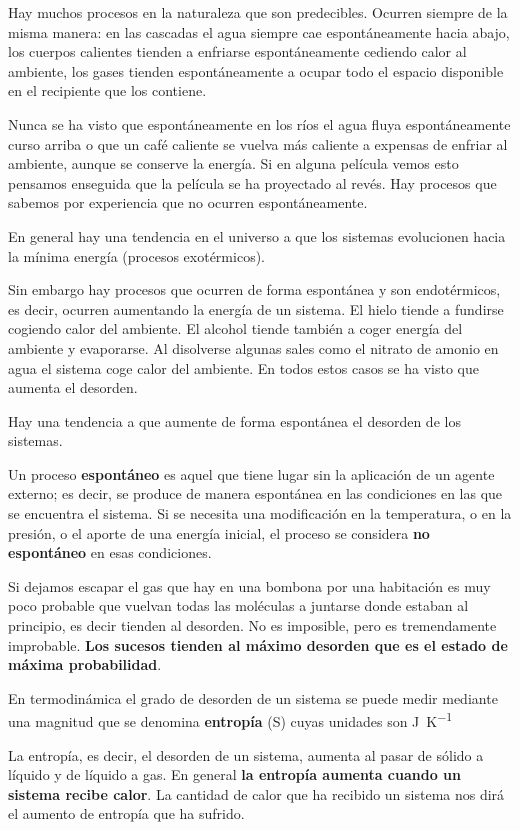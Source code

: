 \documentclass[
  spanish,
]{article}
\begin{document}
Hay muchos procesos en la naturaleza que son predecibles. Ocurren
siempre de la misma manera: en las cascadas el agua siempre cae
espontáneamente hacia abajo, los cuerpos calientes tienden a enfriarse
espontáneamente cediendo calor al ambiente, los gases tienden
espontáneamente a ocupar todo el espacio disponible en el recipiente que
los contiene.

Nunca se ha visto que espontáneamente en los ríos el agua fluya
espontáneamente curso arriba o que un café caliente se vuelva más
caliente a expensas de enfriar al ambiente, aunque se conserve la
energía. Si en alguna película vemos esto pensamos enseguida que la
película se ha proyectado al revés. Hay procesos que sabemos por
experiencia que no ocurren espontáneamente.

En general hay una tendencia en el universo a que los sistemas
evolucionen hacia la mínima energía (procesos exotérmicos).

Sin embargo hay procesos que ocurren de forma espontánea y son
endotérmicos, es decir, ocurren aumentando la energía de un sistema. El
hielo tiende a fundirse cogiendo calor del ambiente. El alcohol tiende
también a coger energía del ambiente y evaporarse. Al disolverse algunas
sales como el nitrato de amonio en agua el sistema coge calor del
ambiente. En todos estos casos se ha visto que aumenta el desorden.

Hay una tendencia a que aumente de forma espontánea el desorden de los
sistemas.

Un proceso \textbf{espontáneo} es aquel que tiene lugar sin la
aplicación de un agente externo; es decir, se produce de manera
espontánea en las condiciones en las que se encuentra el sistema. Si se
necesita una modificación en la temperatura, o en la presión, o el
aporte de una energía inicial, el proceso se considera \textbf{no
espontáneo} en esas condiciones.

Si dejamos escapar el gas que hay en una bombona por una habitación es
muy poco probable que vuelvan todas las moléculas a juntarse donde
estaban al principio, es decir tienden al desorden. No es imposible,
pero es tremendamente improbable. \textbf{Los sucesos tienden al máximo
desorden que es el estado de máxima probabilidad}.

En termodinámica el grado de desorden de un sistema se puede medir
mediante una magnitud que se denomina \textbf{entropía} (S) cuyas
unidades son \unit{\J\per\K}

La entropía, es decir, el desorden de un sistema, aumenta al pasar de
sólido a líquido y de líquido a gas. En general \textbf{la entropía
aumenta cuando un sistema recibe calor}. La cantidad de calor que ha
recibido un sistema nos dirá el aumento de entropía que ha sufrido.
\end{document}
